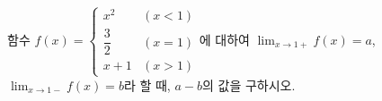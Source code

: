 함수 $f(x)=\begin{cases} x^2 & (x<1) \\ \dfrac{3}{2} & (x=1) \\ x+1 & (x>1) \end{cases}$에 대하여 $\displaystyle\lim_{x\to 1+} f(x)=a$, $\displaystyle\lim_{x\to 1-} f(x)=b$라 할 때, $a-b$의 값을 구하시오.
